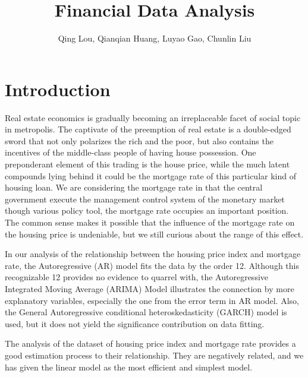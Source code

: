 \documentclass[12pt,letterpaper]{article}
\begin{document}
\title{\textbf{\Large Financial Data Analysis}}
\author{Qing Lou, Qianqian Huang, Luyao Gao, Chunlin Liu}
\date{}
\maketiitle 

\thispagestyle{empty}
\tableofcontents

\newpage
\clearpage





\section{Introduction}

Real estate economics is gradually becoming an irreplaceable facet of social topic in metropolis. 
The captivate of the preemption of real estate is a double-edged sword that not only polarizes the rich and the poor, but also contains the incentives of the middle-class people of having house possession.
One preponderant element of this trading is the house price, while the much latent compounds lying behind it could be the mortgage rate of this particular kind of housing loan.
We are considering the mortgage rate in that the central government execute the management control system of the monetary market though various policy tool, the mortgage rate occupies an important position.
The common sense makes it possible that the influence of the mortgage rate on the housing price is undeniable, but we still curious about the range of this effect.

In our analysis of the relationship between the housing price index and mortgage rate, the Autoregressive (AR) model fits the data by the order 12. 
Although this recognizable 12 provides no evidence to quarrel with, the Autoregressive Integrated Moving Average (ARIMA) Model illustrates the connection by more explanatory variables, especially the one from the error term in AR model.
Also, the General Autoregressive conditional heteroskedasticity (GARCH) model is used, but it does not yield the significance contribution on data fitting.

The analysis of the dataset of housing price index and mortgage rate provides a good estimation process to their relationship. 
They are negatively related, and we has given the linear model as the most efficient and simplest model.
\end{document}
